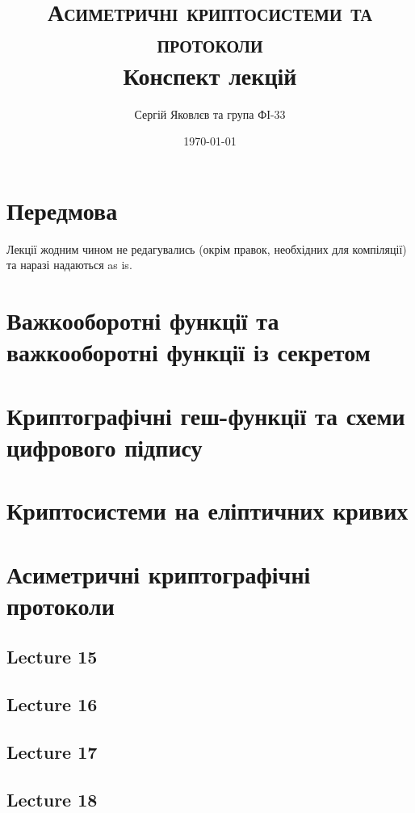 \documentclass[12pt]{report}
\title{\textsc{Асиметричні криптосистеми та протоколи} \\ Конспект лекцій}
\author{Сергій Яковлєв та група ФІ-33}
\date{\today}
\theoremstyle{plain}
\theoremstyle{definition}
\theoremstyle{remark}
\begin{document}
\maketitle
\tableofcontents
\clearpage

\chapter*{Передмова}

Лекції жодним чином не редагувались (окрім правок, необхідних для компіляції) та наразі надаються as is.

\chapter{Важкооборотні функції та важкооборотні функції із секретом}


\chapter{Криптографічні геш-функції та схеми цифрового підпису}


\chapter{Криптосистеми на еліптичних кривих}


\chapter{Асиметричні криптографічні протоколи}

\section{Lecture 15}
\section{Lecture 16}
\section{Lecture 17}
\section{Lecture 18}
\end{document}
